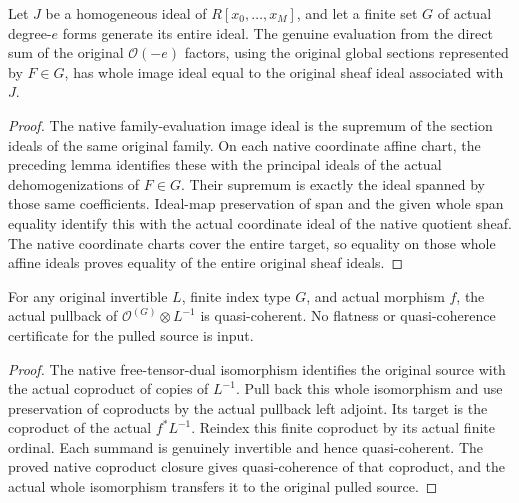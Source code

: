 \begin{lemma}
\label{lem:c0n-original-homogeneous-evaluation-image}
\leanok
Let $J$ be a homogeneous ideal of $R[x_0,\ldots,x_M]$, and let a finite
set $G$ of actual degree-$e$ forms generate its entire ideal.  The genuine
evaluation from the direct sum of the original $\mathcal O(-e)$ factors,
using the original global sections represented by $F\in G$, has whole
image ideal equal to the original sheaf ideal associated with $J$.
\end{lemma}
\begin{proof}
The native family-evaluation image ideal is the supremum of the section
ideals of the same original family.  On each native coordinate affine
chart, the preceding lemma identifies these with the principal ideals
of the actual dehomogenizations of $F\in G$.  Their supremum is exactly
the ideal spanned by those same coefficients.  Ideal-map preservation of
span and the given whole span equality identify this with the actual
coordinate ideal of the native quotient sheaf.  The native coordinate
charts cover the entire target, so equality on those whole affine ideals
proves equality of the entire original sheaf ideals.
\end{proof}

\begin{lemma}
\label{lem:c0n-original-pulled-evaluation-source-coherent}
\leanok
For any original invertible $L$, finite index type $G$, and actual morphism $f$,
the actual pullback of $\mathcal O^{(G)}\otimes L^{-1}$ is quasi-coherent.
No flatness or quasi-coherence certificate for the pulled source is input.
\end{lemma}
\begin{proof}
The native free-tensor-dual isomorphism identifies the original source
with the actual coproduct of copies of $L^{-1}$.  Pull back this whole
isomorphism and use preservation of coproducts by the actual pullback
left adjoint.  Its target is the coproduct of the actual $f^*L^{-1}$.
Reindex this finite coproduct by its actual finite ordinal.  Each summand
is genuinely invertible and hence quasi-coherent.  The proved
native coproduct closure gives quasi-coherence of that coproduct, and the
actual whole isomorphism transfers it to the original pulled source.
\end{proof}

